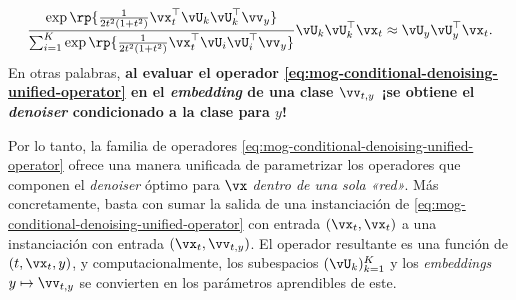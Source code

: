 \documentclass[../../book-main_es.tex]{subfiles}
\begin{document}
\begin{example}
\begin{equation}
        \frac{
            \exp\rp{\frac{1}{2t^{2}(1
            + t^{2})}\vx_t^\top \vU_k \vU_k^\top \vv_y}
        }
        {
            \sum_{i
            = 1}^{K}\exp\rp{\frac{1}{2t^{2}(1
            + t^{2})}\vx_t^\top \vU_i \vU_i^\top \vv_y}
        }
        \vU_{k}\vU_{k}^{\top}\vx_t
        \approx
        \vU_{y}\vU_{y}^{\top}\vx_t.
    \end{equation}
    En otras palabras, \textbf{al evaluar el operador
        \eqref{eq:mog-conditional-denoising-unified-operator} en el
        \textit{embedding} de
    una clase $\vv_{t, y}$ ¡se obtiene el \textit{denoiser} condicionado a la clase para $y$!}

    Por lo tanto, la familia de operadores
    \eqref{eq:mog-conditional-denoising-unified-operator}
    ofrece una manera unificada de parametrizar los operadores
    que componen el \textit{denoiser} óptimo para $\vx$ \textit{dentro de una sola
    «red»}.
    Más concretamente, basta con sumar la salida de una instanciación de
    \eqref{eq:mog-conditional-denoising-unified-operator} con entrada $(\vx_t,
    \vx_t)$ a una instanciación con entrada $(\vx_t, \vv_{t, y})$.
    El operador resultante
    es una función de $(t, \vx_t, y)$, y computacionalmente,
    los subespacios
    $(\vU_k)_{k=1}^K$ y los \textit{embeddings} $y \mapsto \vv_{t, y}$ se convierten en los parámetros
    aprendibles de este.
\end{example}
\end{document}
